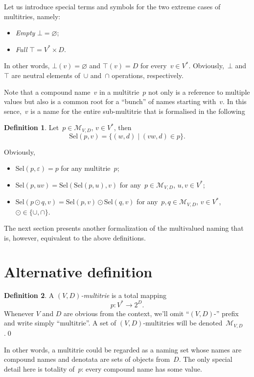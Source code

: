 \documentclass{article}
\theoremstyle{definition}
\newtheorem{Df}{Definition}
\newcommand{\set}[1]{\mathcal{#1}}
\newcommand{\setmt}[2]{\set{M}_{#1,#2}}
\newcommand{\select}{\mathrm{Sel}}
\begin{document}
Let us introduce special terms and symbols for the two extreme cases of
multitries, namely:
\begin{itemize}
\item \emph{Empty} $\bot = \varnothing$;
\item \emph{Full} $\top = V^\ast \times D$.
\end{itemize}
In other words, $\bot(v) = \varnothing$ and $\top(v) = D$ for
every~$v\in V^\ast$. Obviously,~$\bot$ and~$\top$ are neutral elements
of~$\cup$ and~$\cap$ operations, respectively.

Note that a compound name~$v$ in a multitrie~$p$ not only is a reference to
multiple values but also is a common root for a ``bunch'' of names starting
with~$v$. In this sence,~$v$ is a name for the entire sub-multitrie that is
formalised in the following
\begin{Df}\label{def:select-abstract}
Let~$p\in\setmt{V}{D}$, $v\in V^\ast$, then
\[
  \select(p,v) = \{ (w, d) \mid (vw, d)\in p \} .
\]
\end{Df}

Obviously,
\begin{itemize}
\item $\select(p,\varepsilon) = p$ for any multitrie~$p$;
\item $\select(p,uv) = \select(\select(p,u), v)$
  for any~$p\in\setmt{V}{D}$, $u,v\in V^\ast$;
\item $\select(p\odot q, v) = \select(p,v)\odot \select(q,v)$
  for any~$p,q\in\setmt{V}{D}$, $v\in V^\ast$, $\odot\in\{\cup, \cap\}$.
\end{itemize}

The next section presents another formalization of the multivalued naming that
is, however, equivalent to the above definitions.

\section{Alternative definition}

\begin{Df}
A \emph{$(V,D)$-multitrie} is a total mapping
\[
  p : V^\ast \to 2^D .
\]
Whenever $V$ and $D$ are obvious from the context, we'll omit ``$(V,D)$-''
prefix and write simply ``multitrie''. A set of $(V,D)$-multitries will be
denoted~$\setmt{V}{D}$.\qed
\end{Df}

In other words, a multitrie could be regarded as a naming set whose names are
compound names and denotata are sets of objects from~$D$. The only special
detail here is totality of~$p$: every compound name has some value.
\end{document}
